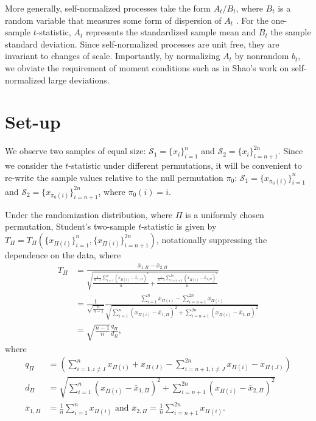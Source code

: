 More generally, self-normalized processes take the form $A_t/B_t$,
where $B_t$ is a random variable that measures some form of dispersion
of $A_t$ \cite{de2004self}.  For the one-sample $t$-statistic, $A_t$
represents the standardized sample mean and $B_t$ the sample standard
deviation.  Since self-normalized processes are unit free, they are invariant to changes of
scale.  Importantly, by normalizing $A_t$ by nonrandom $b_t$, we
obviate the requirement of moment conditions such as in Shao's \cite{shao1997self}
work on self-normalized large deviations.

\section{Set-up}
We observe two samples of equal size: $\mathcal{S}_1 = \{x_i\}_{i=1}^n$
and $\mathcal{S}_2 = \{x_i\}_{i=n+1}^{2n}$.  Since we consider the $t$-statistic
under different permutations, it will be convenient to re-write the
sample values relative to the null permutation $\pi_0$: $\mathcal{S}_1 =
\{x_{\pi_0(i)}\}_{i=1}^n$ and $\mathcal{S}_2 = \{x_{\pi_0(i)}\}_{i=n+1}^{2n}$,
where $\pi_0(i) = i$.

Under the randomization distribution, where
$\Pi$ is a uniformly chosen permutation, Student's two-sample
$t$-statistic is given by $T_{\Pi} = T_{\Pi}(\{x_{\Pi(i)}\}_{i=1}^n,
\{x_{\Pi(i)}\}_{i=n+1}^{2n})$, notationally suppressing the
dependence on the data, where
\begin{align*}
T_{\Pi}
&= \frac{\bar{x}_{1,\Pi} - \bar{x}_{2,\Pi}}{\sqrt{\frac{\frac{1}{n-1}
      \sum_{i=1}^n(x_{\Pi(i)} - \bar{x}_{1,\Pi})^2}{n} + \frac{\frac{1}{n-1}
      \sum_{i=n+1}^{2n}(x_{\Pi(i)} - \bar{x}_{2,\Pi})^2}{n}}} \\
&= \frac{1}{\sqrt{\frac{n}{n-1}}} \frac{\sum_{i=1}^n x_{\Pi(i)} -
  \sum_{i=n+1}^{2n}x_{\Pi(i)}}{\sqrt{\sum_{i=1}^n(x_{\Pi(i)} -
    \bar{x}_{1,\Pi})^2 + \sum_{i=n+1}^{2n}(x_{\Pi(i)} - \bar{x}_{2,\Pi})^2}} \\
&= \sqrt{\frac{n-1}{n}}\frac{q_\Pi}{d_\Pi},
\end{align*}
where
\begin{align*}
  q_\Pi &= \left (\sum_{i=1, i\neq I}^n x_{\Pi(i)} + x_{\Pi(I)} -
    \sum_{i=n+1, i\neq J}^{2n}x_{\Pi(i)} - x_{\Pi(J)}\right ) \\
  d_\Pi &= \sqrt{\sum_{i=1}^n(x_{\Pi(i)} - \bar{x}_{1,\Pi})^2 +
    \sum_{i=n+1}^{2n}(x_{\Pi(i)} - \bar{x}_{2,\Pi})^2} \\
  \bar{x}_{1,\Pi} &= \frac{1}{n} \sum_{i=1}^n x_{\Pi(i)} \text{ and }
  \bar{x}_{2,\Pi} = \frac{1}{n} \sum_{i=n+1}^{2n} x_{\Pi(i)}.
\end{align*}

